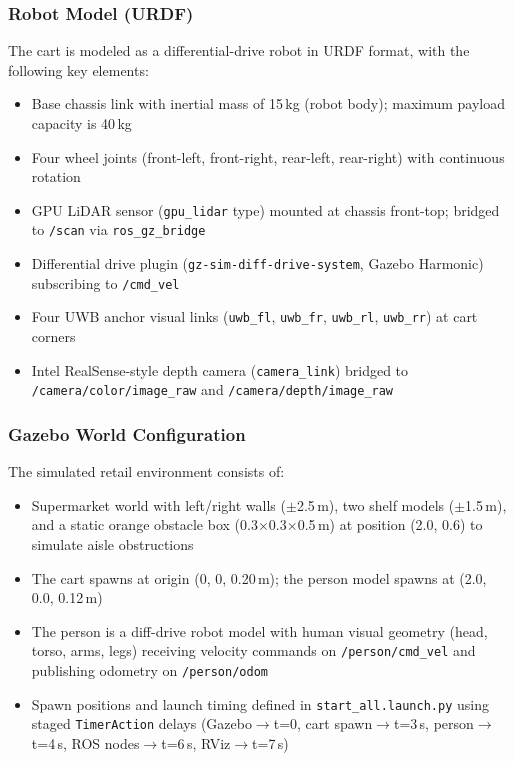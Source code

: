 \subsubsection{Robot Model (URDF)}
The cart is modeled as a differential-drive robot in URDF format,
with the following key elements:
\begin{itemize}
  \item Base chassis link with inertial mass of 15\,kg (robot body); 
        maximum payload capacity is 40\,kg
  \item Four wheel joints (front-left, front-right, rear-left, 
        rear-right) with continuous rotation
  \item GPU LiDAR sensor (\texttt{gpu\_lidar} type) mounted at 
        chassis front-top; bridged to \texttt{/scan} via 
        \texttt{ros\_gz\_bridge}
  \item Differential drive plugin 
        (\texttt{gz-sim-diff-drive-system}, Gazebo Harmonic) 
        subscribing to \texttt{/cmd\_vel}
  \item Four UWB anchor visual links (\texttt{uwb\_fl}, 
        \texttt{uwb\_fr}, \texttt{uwb\_rl}, \texttt{uwb\_rr}) 
        at cart corners
  \item Intel RealSense-style depth camera (\texttt{camera\_link}) 
        bridged to \texttt{/camera/color/image\_raw} and 
        \texttt{/camera/depth/image\_raw}
\end{itemize}

\subsubsection{Gazebo World Configuration}

The simulated retail environment consists of:
\begin{itemize}
  \item Supermarket world with left/right walls ($\pm$2.5\,m), 
        two shelf models ($\pm$1.5\,m), and a static orange 
        obstacle box (0.3$\times$0.3$\times$0.5\,m) at position 
        (2.0, 0.6) to simulate aisle obstructions
  \item The cart spawns at origin (0, 0, 0.20\,m); the person 
        model spawns at (2.0, 0.0, 0.12\,m)
  \item The person is a diff-drive robot model with human visual 
        geometry (head, torso, arms, legs) receiving velocity 
        commands on \texttt{/person/cmd\_vel} and publishing 
        odometry on \texttt{/person/odom}
  \item Spawn positions and launch timing defined in 
        \texttt{start\_all.launch.py} using staged 
        \texttt{TimerAction} delays (Gazebo$\to$t=0, 
        cart spawn$\to$t=3\,s, person$\to$t=4\,s, 
        ROS nodes$\to$t=6\,s, RViz$\to$t=7\,s)
\end{itemize}

